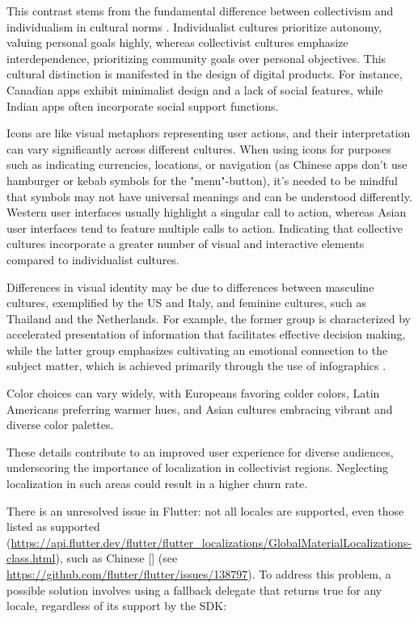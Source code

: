 This contrast stems from the fundamental difference between collectivism and individualism in cultural norms 
\cite{Wall23}. Individualist cultures prioritize autonomy, valuing personal goals highly, whereas collectivist cultures 
emphasize interdependence, prioritizing community goals over personal objectives. This cultural distinction is 
manifested in the design of digital products. For instance, Canadian apps exhibit minimalist design and a lack of social 
features, while Indian apps often incorporate social support functions.

Icons are like visual metaphors representing user actions, and their interpretation can vary significantly across 
different cultures. When using icons for purposes such as indicating currencies, locations, or navigation (as Chinese 
apps don't use hamburger or kebab symbols for the "menu"-button), it's needed to be mindful that symbols may not have 
universal meanings and can be understood differently. Western user interfaces usually highlight a singular call to 
action, whereas Asian user interfaces tend to feature multiple calls to action. Indicating that collective cultures
incorporate a greater number of visual and interactive elements compared to individualist cultures.

Differences in visual identity may be due to differences between masculine cultures, exemplified by the US and Italy, 
and feminine cultures, such as Thailand and the Netherlands. For example, the former group is characterized by 
accelerated presentation of information that facilitates effective decision making, while the latter group emphasizes 
cultivating an emotional connection to the subject matter, which is achieved primarily through the use of infographics
\cite{Wal923}.

Color choices can vary widely, with Europeans favoring colder colors, Latin Americans preferring warmer hues, and Asian 
cultures embracing vibrant and diverse color palettes.


\noindent These details \cite{Rein14} contribute to an improved user experience for diverse audiences, underscoring the 
importance of localization in collectivist regions. Neglecting localization in such areas could result in a higher 
churn rate.

There is an unresolved issue in Flutter: not all locales are supported, even those listed as supported 
(\href{https://api.flutter.dev/flutter/flutter\_localizations/GlobalMaterialLocalizations-class.html}{https://api.flutter.dev/flutter/flutter\_localizations/GlobalMaterialLocalizations-class.html}), 
such as Chinese [] (see \href{https://github.com/flutter/flutter/issues/138797}{https://github.com/flutter/flutter/issues/138797}). 
To address this problem, a possible solution involves using a fallback delegate that returns true for any locale, 
regardless of its support by the SDK:

